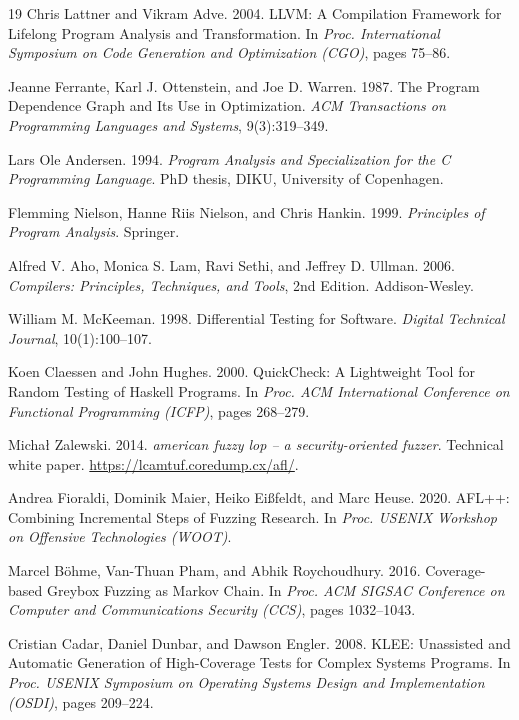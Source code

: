\documentclass[11pt,twocolumn]{article}
\begin{document}
\begin{thebibliography}{19}
Chris Lattner and Vikram Adve. 2004.
\newblock LLVM: A Compilation Framework for Lifelong Program Analysis and
Transformation.
\newblock In \emph{Proc. International Symposium on Code Generation and
Optimization (CGO)}, pages 75--86.

Jeanne Ferrante, Karl J. Ottenstein, and Joe D. Warren. 1987.
\newblock The Program Dependence Graph and Its Use in Optimization.
\newblock \emph{ACM Transactions on Programming Languages and Systems},
9(3):319--349.

Lars Ole Andersen. 1994.
\newblock \emph{Program Analysis and Specialization for the C Programming
Language}.
\newblock PhD thesis, DIKU, University of Copenhagen.

Flemming Nielson, Hanne Riis Nielson, and Chris Hankin. 1999.
\newblock \emph{Principles of Program Analysis}.
\newblock Springer.

Alfred V. Aho, Monica S. Lam, Ravi Sethi, and Jeffrey D. Ullman. 2006.
\newblock \emph{Compilers: Principles, Techniques, and Tools}, 2nd Edition.
\newblock Addison-Wesley.

William M. McKeeman. 1998.
\newblock Differential Testing for Software.
\newblock \emph{Digital Technical Journal}, 10(1):100--107.

Koen Claessen and John Hughes. 2000.
\newblock QuickCheck: A Lightweight Tool for Random Testing of Haskell
Programs.
\newblock In \emph{Proc. ACM International Conference on Functional
Programming (ICFP)}, pages 268--279.

Michał Zalewski. 2014.
\newblock \emph{american fuzzy lop -- a security-oriented fuzzer}.
\newblock Technical white paper.
\newblock \url{https://lcamtuf.coredump.cx/afl/}.

Andrea Fioraldi, Dominik Maier, Heiko Eißfeldt, and Marc Heuse. 2020.
\newblock AFL++: Combining Incremental Steps of Fuzzing Research.
\newblock In \emph{Proc. USENIX Workshop on Offensive Technologies (WOOT)}.

Marcel Böhme, Van-Thuan Pham, and Abhik Roychoudhury. 2016.
\newblock Coverage-based Greybox Fuzzing as Markov Chain.
\newblock In \emph{Proc. ACM SIGSAC Conference on Computer and
Communications Security (CCS)}, pages 1032--1043.

Cristian Cadar, Daniel Dunbar, and Dawson Engler. 2008.
\newblock KLEE: Unassisted and Automatic Generation of High-Coverage
Tests for Complex Systems Programs.
\newblock In \emph{Proc. USENIX Symposium on Operating Systems Design
and Implementation (OSDI)}, pages 209--224.


\end{thebibliography}
\end{document}
